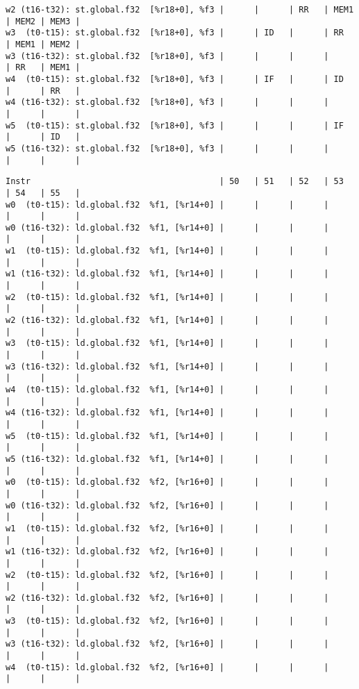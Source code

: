 \documentclass[11pt]{article}
\begin{document}
\begin{Answer}
\begin{verbatim}
w2 (t16-t32): st.global.f32  [%r18+0], %f3 |      |      | RR   | MEM1 | MEM2 | MEM3 |
w3  (t0-t15): st.global.f32  [%r18+0], %f3 |      | ID   |      | RR   | MEM1 | MEM2 |
w3 (t16-t32): st.global.f32  [%r18+0], %f3 |      |      |      |      | RR   | MEM1 |
w4  (t0-t15): st.global.f32  [%r18+0], %f3 |      | IF   |      | ID   |      | RR   |
w4 (t16-t32): st.global.f32  [%r18+0], %f3 |      |      |      |      |      |      |
w5  (t0-t15): st.global.f32  [%r18+0], %f3 |      |      |      | IF   |      | ID   |
w5 (t16-t32): st.global.f32  [%r18+0], %f3 |      |      |      |      |      |      |
\end{verbatim}
\newpage
\begin{verbatim}
Instr                                      | 50   | 51   | 52   | 53   | 54   | 55   |
w0  (t0-t15): ld.global.f32  %f1, [%r14+0] |      |      |      |      |      |      |
w0 (t16-t32): ld.global.f32  %f1, [%r14+0] |      |      |      |      |      |      |
w1  (t0-t15): ld.global.f32  %f1, [%r14+0] |      |      |      |      |      |      |
w1 (t16-t32): ld.global.f32  %f1, [%r14+0] |      |      |      |      |      |      |
w2  (t0-t15): ld.global.f32  %f1, [%r14+0] |      |      |      |      |      |      |
w2 (t16-t32): ld.global.f32  %f1, [%r14+0] |      |      |      |      |      |      |
w3  (t0-t15): ld.global.f32  %f1, [%r14+0] |      |      |      |      |      |      |
w3 (t16-t32): ld.global.f32  %f1, [%r14+0] |      |      |      |      |      |      |
w4  (t0-t15): ld.global.f32  %f1, [%r14+0] |      |      |      |      |      |      |
w4 (t16-t32): ld.global.f32  %f1, [%r14+0] |      |      |      |      |      |      |
w5  (t0-t15): ld.global.f32  %f1, [%r14+0] |      |      |      |      |      |      |
w5 (t16-t32): ld.global.f32  %f1, [%r14+0] |      |      |      |      |      |      |
w0  (t0-t15): ld.global.f32  %f2, [%r16+0] |      |      |      |      |      |      |
w0 (t16-t32): ld.global.f32  %f2, [%r16+0] |      |      |      |      |      |      |
w1  (t0-t15): ld.global.f32  %f2, [%r16+0] |      |      |      |      |      |      |
w1 (t16-t32): ld.global.f32  %f2, [%r16+0] |      |      |      |      |      |      |
w2  (t0-t15): ld.global.f32  %f2, [%r16+0] |      |      |      |      |      |      |
w2 (t16-t32): ld.global.f32  %f2, [%r16+0] |      |      |      |      |      |      |
w3  (t0-t15): ld.global.f32  %f2, [%r16+0] |      |      |      |      |      |      |
w3 (t16-t32): ld.global.f32  %f2, [%r16+0] |      |      |      |      |      |      |
w4  (t0-t15): ld.global.f32  %f2, [%r16+0] |      |      |      |      |      |      |

\end{verbatim}
\end{Answer}
\end{document}
